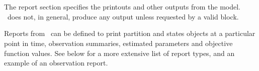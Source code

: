 \section{\label{sec:report-section}}
The report section specifies the printouts and other outputs from the model. \IBM\ does not, in general, produce any output unless requested by a valid  block. 

Reports from \IBM\ can be defined to print partition and states objects at a particular point in time, observation summaries, estimated parameters and objective function values. See below for a more extensive list of report types, and an example of an observation report.

